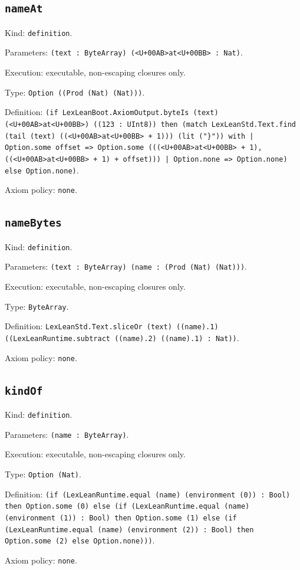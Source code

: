 \documentclass[11pt]{article}
\begin{document}
\subsection*{\texttt{nameAt}}
\noindent Kind: \texttt{definition}.\par
\noindent Parameters: \texttt{(text : ByteArray) (<U+00AB>at<U+00BB> : Nat)}.\par
\noindent Execution: executable, non-escaping closures only.\par
\noindent Type: \texttt{Option ((Prod (Nat) (Nat)))}.\par
\noindent Definition: \texttt{(if LexLeanBoot.AxiomOutput.byteIs (text) (<U+00AB>at<U+00BB>) ((123 : UInt8)) then (match LexLeanStd.Text.find (tail (text) ((<U+00AB>at<U+00BB> + 1))) (lit ("\}")) with | Option.some offset => Option.some (((<U+00AB>at<U+00BB> + 1), ((<U+00AB>at<U+00BB> + 1) + offset))) | Option.none => Option.none) else Option.none)}.\par
\noindent Axiom policy: \texttt{none}.\par
\subsection*{\texttt{nameBytes}}
\noindent Kind: \texttt{definition}.\par
\noindent Parameters: \texttt{(text : ByteArray) (name : (Prod (Nat) (Nat)))}.\par
\noindent Execution: executable, non-escaping closures only.\par
\noindent Type: \texttt{ByteArray}.\par
\noindent Definition: \texttt{LexLeanStd.Text.sliceOr (text) ((name).1) ((LexLeanRuntime.subtract ((name).2) ((name).1) : Nat))}.\par
\noindent Axiom policy: \texttt{none}.\par
\subsection*{\texttt{kindOf}}
\noindent Kind: \texttt{definition}.\par
\noindent Parameters: \texttt{(name : ByteArray)}.\par
\noindent Execution: executable, non-escaping closures only.\par
\noindent Type: \texttt{Option (Nat)}.\par
\noindent Definition: \texttt{(if (LexLeanRuntime.equal (name) (environment (0)) : Bool) then Option.some (0) else (if (LexLeanRuntime.equal (name) (environment (1)) : Bool) then Option.some (1) else (if (LexLeanRuntime.equal (name) (environment (2)) : Bool) then Option.some (2) else Option.none)))}.\par
\noindent Axiom policy: \texttt{none}.\par
\end{document}
